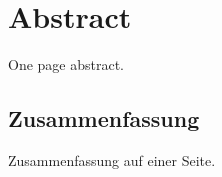 %
%
%
\begingroup
\chapter*{Abstract}

  One page abstract.

\begin{german}
  \renewcommand{\cleardoublepage}{\clearpage}
  \chapter*{Zusammenfassung}
  \slshape\small

  Zusammenfassung auf einer Seite.

\end{german}
\endgroup
